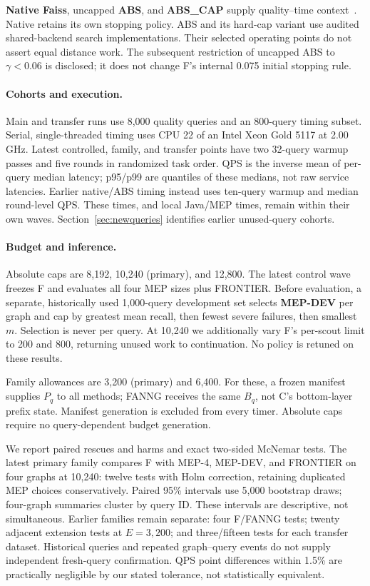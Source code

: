 \textbf{Native Faiss}, uncapped \textbf{ABS}, and \textbf{ABS\_CAP} supply quality--time context~\cite{faiss,abs}. Native retains its own stopping policy. ABS and its hard-cap variant use audited shared-backend search implementations. Their selected operating points do not assert equal distance work. The subsequent restriction of uncapped ABS to $\gamma<0.06$ is disclosed; it does not change F's internal 0.075 initial stopping rule.

\paragraph{Cohorts and execution.}
Main and transfer runs use 8,000 quality queries and an 800-query timing subset. Serial, single-threaded timing uses CPU 22 of an Intel Xeon Gold 5117 at 2.00\,GHz. Latest controlled, family, and transfer points have two 32-query warmup passes and five rounds in randomized task order. QPS is the inverse mean of per-query median latency; p95/p99 are quantiles of these medians, not raw service latencies. Earlier native/ABS timing instead uses ten-query warmup and median round-level QPS. These times, and local Java/MEP times, remain within their own waves. Section~\ref{sec:newqueries} identifies earlier unused-query cohorts.

\paragraph{Budget and inference.}
Absolute caps are 8,192, 10,240 (primary), and 12,800. The latest control wave freezes F and evaluates all four MEP sizes plus FRONTIER. Before evaluation, a separate, historically used 1,000-query development set selects \textbf{MEP-DEV} per graph and cap by greatest mean recall, then fewest severe failures, then smallest $m$. Selection is never per query. At 10,240 we additionally vary F's per-scout limit to 200 and 800, returning unused work to continuation. No policy is retuned on these results.

Family allowances are 3,200 (primary) and 6,400. For these, a frozen manifest supplies $P_q$ to all methods; FANNG receives the same $B_q$, not C's bottom-layer prefix state. Manifest generation is excluded from every timer. Absolute caps require no query-dependent budget generation.

We report paired rescues and harms and exact two-sided McNemar tests. The latest primary family compares F with MEP-4, MEP-DEV, and FRONTIER on four graphs at 10,240: twelve tests with Holm correction, retaining duplicated MEP choices conservatively. Paired 95\% intervals use 5,000 bootstrap draws; four-graph summaries cluster by query ID. These intervals are descriptive, not simultaneous. Earlier families remain separate: four F/FANNG tests; twenty adjacent extension tests at $E=3{,}200$; and three/fifteen tests for each transfer dataset. Historical queries and repeated graph--query events do not supply independent fresh-query confirmation. QPS point differences within 1.5\% are practically negligible by our stated tolerance, not statistically equivalent.
